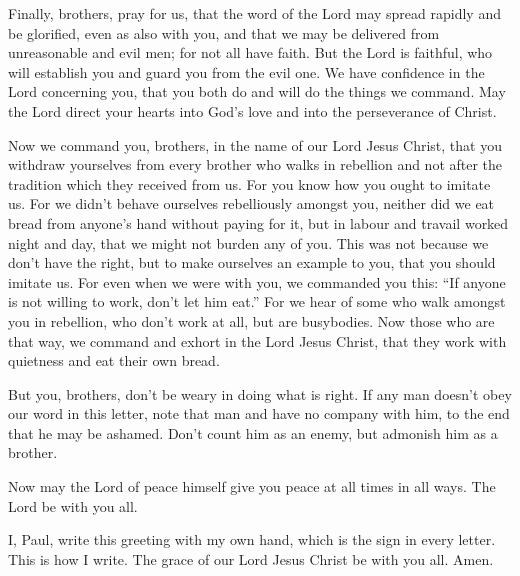  Finally, brothers, pray for us, that the word of the Lord
may spread rapidly and be glorified, even as also with you, 
and that we may be delivered from unreasonable and evil men; for not all
have faith.  But the Lord is faithful, who will establish
you and guard you from the evil one.  We have confidence in
the Lord concerning you, that you both do and will do the things we
command.  May the Lord direct your hearts into God's love
and into the perseverance of Christ.

 Now we command you, brothers, in the name of our Lord Jesus
Christ, that you withdraw yourselves from every brother who walks in
rebellion and not after the tradition which they received from us.
 For you know how you ought to imitate us. For we didn't
behave ourselves rebelliously amongst you,  neither did we
eat bread from anyone's hand without paying for it, but in labour and
travail worked night and day, that we might not burden any of you.
 This was not because we don't have the right, but to make
ourselves an example to you, that you should imitate us. 
For even when we were with you, we commanded you this: ``If anyone is
not willing to work, don't let him eat.''  For we hear of
some who walk amongst you in rebellion, who don't work at all, but are
busybodies.  Now those who are that way, we command and
exhort in the Lord Jesus Christ, that they work with quietness and eat
their own bread.

 But you, brothers, don't be weary in doing what is right.
 If any man doesn't obey our word in this letter, note that
man and have no company with him, to the end that he may be ashamed.
 Don't count him as an enemy, but admonish him as a
brother.

 Now may the Lord of peace himself give you peace at all
times in all ways. The Lord be with you all.

 I, Paul, write this greeting with my own hand, which is
the sign in every letter. This is how I write.  The grace
of our Lord Jesus Christ be with you all. Amen.
